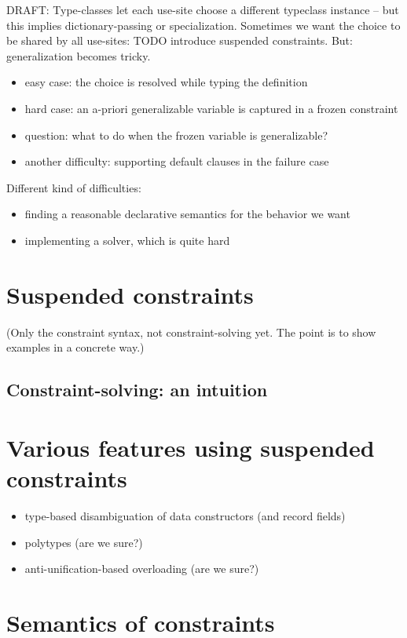 \documentclass[acmsmall,screen,nonacm]{acmart}
\begin{document}
DRAFT: Type-classes let each use-site choose a different typeclass instance -- but this implies dictionary-passing or specialization. Sometimes we want the choice to be shared by all use-sites: TODO introduce suspended constraints. But: generalization becomes tricky.
\begin{itemize}
\item easy case: the choice is resolved while typing the definition
\item hard case: an a-priori generalizable variable is captured in a frozen constraint
\item question: what to do when the frozen variable is generalizable?
\item another difficulty: supporting default clauses in the failure case
\end{itemize}

Different kind of difficulties:
\begin{itemize}
\item finding a reasonable declarative semantics for the behavior we want
\item implementing a solver, which is quite hard
\end{itemize}

\section{Suspended constraints}

(Only the constraint syntax, not constraint-solving yet. The point is to show examples in a concrete way.)

\subsection{Constraint-solving: an intuition}

\section{Various features using suspended constraints}

\begin{itemize}
\item type-based disambiguation of data constructors (and record fields)
\item polytypes (are we sure?)
\item anti-unification-based overloading (are we sure?)
\end{itemize}

\section{Semantics of constraints}
\end{document}
